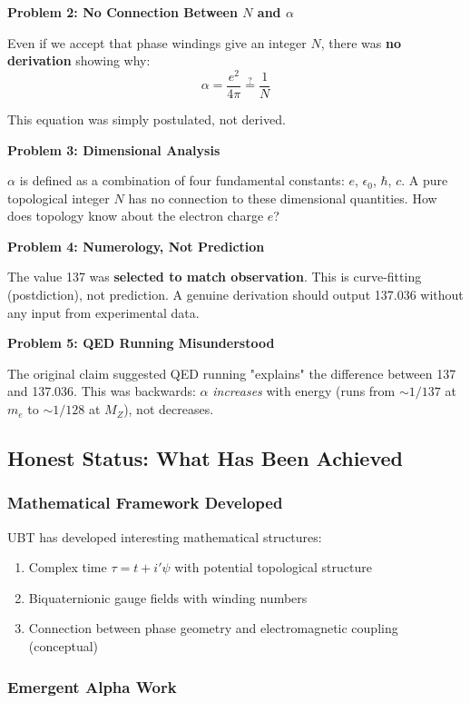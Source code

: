 \textbf{Problem 2: No Connection Between $N$ and $\alpha$}

Even if we accept that phase windings give an integer $N$, there was \textbf{no derivation} showing why:
\begin{equation}
\alpha = \frac{e^2}{4\pi} \overset{?}{=} \frac{1}{N}
\end{equation}

This equation was simply postulated, not derived.

\textbf{Problem 3: Dimensional Analysis}

$\alpha$ is defined as a combination of four fundamental constants: $e$, $\epsilon_0$, $\hbar$, $c$. A pure topological integer $N$ has no connection to these dimensional quantities. How does topology know about the electron charge $e$?

\textbf{Problem 4: Numerology, Not Prediction}

The value 137 was \textbf{selected to match observation}. This is curve-fitting (postdiction), not prediction. A genuine derivation should output 137.036 without any input from experimental data.

\textbf{Problem 5: QED Running Misunderstood}

The original claim suggested QED running "explains" the difference between 137 and 137.036. This was backwards: $\alpha$ \emph{increases} with energy (runs from $\sim 1/137$ at $m_e$ to $\sim 1/128$ at $M_Z$), not decreases.

\subsection{Honest Status: What Has Been Achieved}

\subsubsection{Mathematical Framework Developed}

UBT has developed interesting mathematical structures:
\begin{enumerate}
\item Complex time $\tau = t + i'\psi$ with potential topological structure
\item Biquaternionic gauge fields with winding numbers
\item Connection between phase geometry and electromagnetic coupling (conceptual)
\end{enumerate}

\subsubsection{Emergent Alpha Work}

